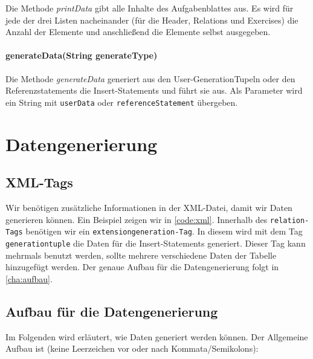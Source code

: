 \documentclass[11pt]{report}
\begin{document}
Die Methode \textit{printData} gibt alle Inhalte des Aufgabenblattes aus.
Es wird für jede der drei Listen nacheinander (für die Header, Relations und Exercises) die Anzahl der Elemente und anschließend die Elemente selbst ausgegeben.

\subsubsection*{generateData(String generateType)}

Die Methode \textit{generateData} generiert aus den User-GenerationTupeln oder den Referenzstatements die Insert-Statements und führt sie aus.
Als Parameter wird ein String mit \texttt{userData} oder \texttt{referenceStatement} übergeben.

\chapter{Datengenerierung}

\section{XML-Tags}

Wir benötigen zusätzliche Informationen in der XML-Datei, damit wir Daten generieren können. Ein Beispiel zeigen wir in \autoref{code:xml}. Innerhalb des \texttt{relation-Tags} benötigen wir ein \texttt{extensiongeneration-Tag}. In diesem wird mit dem Tag \texttt{generationtuple} die Daten für die Insert-Statements generiert. Dieser Tag kann mehrmals benutzt werden, sollte mehrere verschiedene Daten der Tabelle hinzugefügt werden. Der genaue Aufbau für die Datengenerierung folgt in \autoref{cha:aufbau}.

\begin{figure}[h]
	\centering
	\begin{minipage}{0.9\textwidth}
		
	\end{minipage}
\end{figure}


\section{Aufbau für die Datengenerierung}
\label{cha:aufbau}

Im Folgenden wird erläutert, wie Daten generiert werden können. Der Allgemeine Aufbau ist (keine Leerzeichen vor oder nach Kommata/Semikolons):\\
\end{document}
